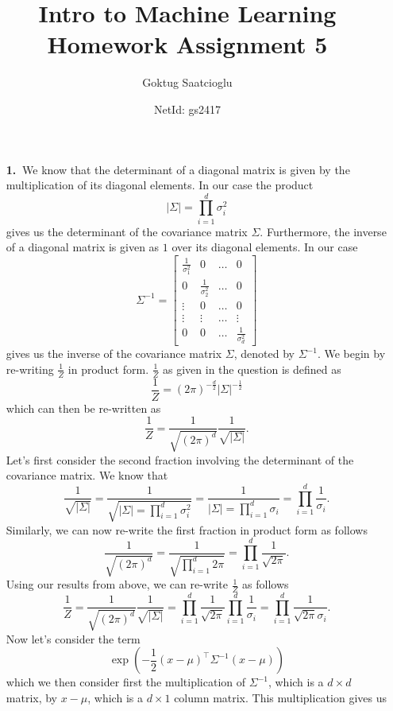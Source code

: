\documentclass [10pt]{article}
\begin{document}
\title{Intro to Machine Learning Homework Assignment 5}
\author{Goktug Saatcioglu}
\date{NetId: gs2417}
\maketitle

\begin{enumerate}
	\item[\textbf{1.$\>$}]We know that the determinant of a diagonal matrix is given by the multiplication of its diagonal elements. In our case the product$$\left|\Sigma\right|=\prod_{i=1}^{d}\sigma_{i}^{2}$$gives us the determinant of the covariance matrix $\Sigma$. Furthermore, the inverse of a diagonal matrix is given as $1$ over its diagonal elements. In our case
	\[\Sigma^{-1}=
	\begin{bmatrix}
		\frac{1}{\sigma_{1}^{2}} & 0 & \dots & 0 \\
		0 & \frac{1}{\sigma_{2}^{2}} & \dots & 0 \\
		\vdots & 0 & \dots & 0 \\
		\vdots & \vdots & \dots & \vdots \\
		0 & 0 & \dots & \frac{1}{\sigma_{d}^{2}}
	\end{bmatrix}
	\]
	gives us the inverse of the covariance matrix $\Sigma$, denoted by $\Sigma^{-1}$. We begin by re-writing $\frac{1}{Z}$ in product form. $\frac{1}{Z}$ as given in the question is defined as$$\frac{1}{Z} = (2\pi)^{-\frac{d}{2}}\left|\Sigma\right|^{-\frac{1}{2}}$$which can then be re-written as$$\frac{1}{Z} = \frac{1}{\sqrt{(2\pi)^{d}}}\frac{1}{\sqrt{\left|\Sigma\right|}}.$$Let's first consider the second fraction involving the determinant of the covariance matrix. We know that$$\frac{1}{\sqrt{\left|\Sigma\right|}}=\frac{1}{\sqrt{\left|\Sigma\right|=\prod_{i=1}^{d}\sigma_{i}^{2}}}=\frac{1}{\left|\Sigma\right|=\prod_{i=1}^{d}\sigma_{i}}=\prod_{i=1}^{d}\frac{1}{\sigma_{i}}.$$Similarly, we can now re-write the first fraction in product form as follows$$\frac{1}{\sqrt{(2\pi)^{d}}}=\frac{1}{\sqrt{\prod_{i=1}^{d}2\pi}}=\prod_{i=1}^{d}\frac{1}{\sqrt{2\pi}}.$$Using our results from above, we can re-write $\frac{1}{Z}$ as follows$$\frac{1}{Z} = \frac{1}{\sqrt{(2\pi)^{d}}}\frac{1}{\sqrt{\left|\Sigma\right|}}=\prod_{i=1}^{d}\frac{1}{\sqrt{2\pi}}\prod_{i=1}^{d}\frac{1}{\sigma_{i}}=\prod_{i=1}^{d}\frac{1}{\sqrt{2\pi}\sigma_{i}}.$$Now let's consider the term $$\exp(-\frac{1}{2}(x-\mu)^{\top}\Sigma^{-1}(x-\mu))$$which we then consider first the multiplication of $\Sigma^{-1}$, which is a $d\times d$ matrix, by $x-\mu$, which is a $d\times 1$ column matrix. This multiplication gives us

\end{enumerate}
\end{document}

